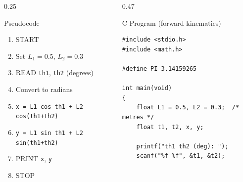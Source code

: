 \documentclass[aspectratio=169]{beamer}
\begin{document}
	\begin{frame}{}

		\vspace*{0.05cm}

		\begin{columns}[T,onlytextwidth]


			\begin{column}{0.25\textwidth}

				\begin{block}{Pseudocode}
					\scriptsize
					\begin{enumerate}
						\item START
						\item Set $L_1 = 0.5$, $L_2 = 0.3$
						\item READ \texttt{th1}, \texttt{th2} (degrees)
						\item Convert to radians
						\item \texttt{x = L1 cos th1 + L2 cos(th1+th2)}
						\item \texttt{y = L1 sin th1 + L2 sin(th1+th2)}
						\item PRINT \texttt{x}, \texttt{y}
						\item STOP
					\end{enumerate}
				\end{block}

			\end{column}


			\hspace*{0.3cm}
			\begin{column}{0.47\textwidth}

				\begin{block}{C Program (forward kinematics)}

\begin{lstlisting}[style=cstyle,numbers=none,basicstyle=\ttfamily\scriptsize]
#include <stdio.h>
#include <math.h>

#define PI 3.14159265

int main(void)
{
	float L1 = 0.5, L2 = 0.3;  /* metres */
	float t1, t2, x, y;

	printf("th1 th2 (deg): ");
	scanf("%f %f", &t1, &t2);


\end{lstlisting}
\end{block}
\end{column}
\end{columns}
\end{frame}
\end{document}
